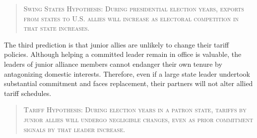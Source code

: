 \documentclass[12pt]{article}
\begin{document}
\begin{quote}
\textsc{Swing States Hypothesis: During presidential election years, exports from states to U.S. allies will increase as electoral competition in that state increases.}
\end{quote}

%
%
%


The third prediction is that junior allies are unlikely to change their tariff policies. 
Although helping a committed leader remain in office is valuable, the leaders of junior alliance members cannot endanger their own tenure by antagonizing domestic interests.
Therefore, even if a large state leader undertook substantial commitment and faces replacement, their partners will not alter allied tariff schedules. 


\begin{quote}
\textsc{Tariff Hypothesis: During election years in a patron state, tariffs by junior allies will undergo negligible changes, even as prior commitment signals by that leader increase.}
\end{quote}
\end{document}
